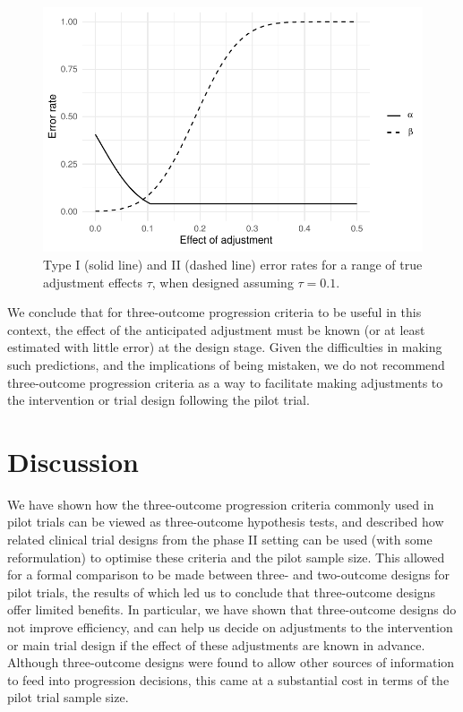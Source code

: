\documentclass[sagev]{sagej}
\begin{document}
\begin{figure}
\centering
\includegraphics[scale=0.8]{./figures/tau_ocs}
\caption{Type I (solid line) and II (dashed line) error rates for a range of true adjustment effects $\tau$, when designed assuming $\tau = 0.1$.}
\label{fig:tau_ocs}
\end{figure}

We conclude that for three-outcome progression criteria to be useful in this context, the effect of the anticipated adjustment must be known (or at least estimated with little error) at the design stage. Given the difficulties in making such predictions, and the implications of being mistaken, we do not recommend three-outcome progression criteria as a way to facilitate making adjustments to the intervention or trial design following the pilot trial.

\section{Discussion}\label{sec:discussion}

We have shown how the three-outcome progression criteria commonly used in pilot trials can be viewed as three-outcome hypothesis tests, and described how related clinical trial designs from the phase II setting can be used (with some reformulation) to optimise these criteria and the pilot sample size. This allowed for a formal comparison to be made between three- and two-outcome designs for pilot trials, the results of which led us to conclude that three-outcome designs offer limited benefits. In particular, we have shown that three-outcome designs do not improve efficiency, and can help us decide on adjustments to the intervention or main trial design if the effect of these adjustments are known in advance. Although three-outcome designs were found to allow other sources of information to feed into progression decisions, this came at a substantial cost in terms of the pilot trial sample size.
\end{document}
